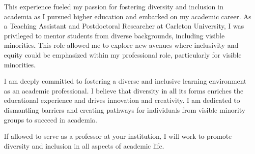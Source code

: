 \documentclass[11pt]{article}
\begin{document}
This experience fueled my passion for fostering diversity and inclusion in academia as I pursued higher education and embarked on my academic career. As a Teaching Assistant and Postdoctoral Researcher at Carleton University, I was privileged to mentor students from diverse backgrounds, including visible minorities. This role allowed me to explore new avenues where inclusivity and equity could be emphasized within my professional role, particularly for visible minorities.



I am deeply committed to fostering a diverse and inclusive learning environment as an academic professional. I believe that diversity in all its forms enriches the educational experience and drives innovation and creativity. I am dedicated to dismantling barriers and creating pathways for individuals from visible minority groups to succeed in academia. 

If allowed to serve as a professor at your institution, I will work to promote diversity and inclusion in all aspects of academic life.




\end{document}
